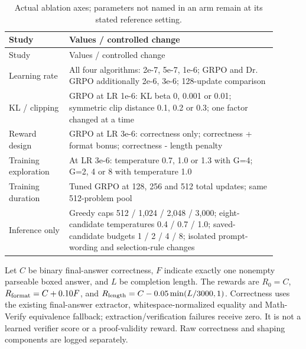 \begingroup\footnotesize\setlength{\tabcolsep}{3pt}
\begin{longtable}{>{\raggedright\arraybackslash}p{0.2070\linewidth}>{\raggedright\arraybackslash}p{0.6930\linewidth}}
\caption{Actual ablation axes; parameters not named in an arm remain at its stated reference setting.}\\
\toprule Study & Values /\allowbreak{} controlled change \\
\midrule\endfirsthead
\toprule Study & Values /\allowbreak{} controlled change \\
\midrule\endhead
\midrule\multicolumn{2}{r}{Continued on next page}\endfoot
\bottomrule\endlastfoot
Learning rate & All four algorithms: 2e-7, 5e-7, 1e-6; GRPO and Dr. GRPO additionally 2e-6, 3e-6; 128-update comparison \\
KL /\allowbreak{} clipping & GRPO at LR 1e-6: KL beta 0, 0.001 or 0.01; symmetric clip distance 0.1, 0.2 or 0.3; one factor changed at a time \\
Reward design & GRPO at LR 3e-6: correctness only; correctness + format bonus; correctness - length penalty \\
Training exploration & At LR 3e-6: temperature 0.7, 1.0 or 1.3 with G=4; G=2, 4 or 8 with temperature 1.0 \\
Training duration & Tuned GRPO at 128, 256 and 512 total updates; same 512-problem pool \\
Inference only & Greedy caps 512 /\allowbreak{} 1,024 /\allowbreak{} 2,048 /\allowbreak{} 3,000; eight-candidate temperatures 0.4 /\allowbreak{} 0.7 /\allowbreak{} 1.0; saved-candidate budgets 1 /\allowbreak{} 2 /\allowbreak{} 4 /\allowbreak{} 8; isolated prompt-wording and selection-rule changes \\
\end{longtable}\endgroup


Let $C$ be binary final-answer correctness, $F$ indicate exactly one nonempty parseable boxed answer, and $L$ be completion length. The rewards are $R_0=C$, $R_{\rm format}=C+0.10F$, and $R_{\rm length}=C-0.05\min(L/3000,1)$. Correctness uses the existing final-answer extractor, whitespace-normalized equality and Math-Verify equivalence fallback; extraction/verification failures receive zero. It is not a learned verifier score or a proof-validity reward. Raw correctness and shaping components are logged separately.

